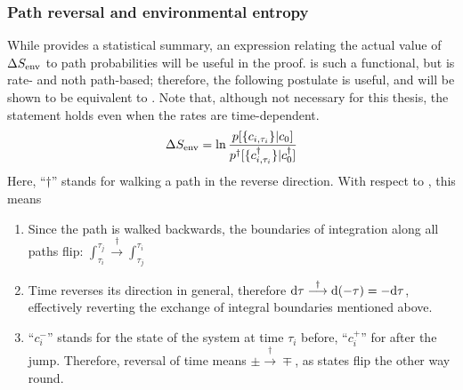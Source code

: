 \subsubsection{Path reversal and environmental entropy}

While  provides a statistical summary, an expression relating the actual value of \(\Delta S_\text{env}\) to path probabilities will be useful in the proof.  is such a functional, but is rate- and noth path-based; therefore, the following postulate is useful, and will be shown to be equivalent to . Note that, although not necessary for this thesis, the statement holds even when the rates are time-dependent.
%
\begin{equation}
	\label{eqn:SEnv path functional}
	\Delta S_\text{env}
	= \ln\frac{p[\{c_{i,\tau_i}\}|c_0]}{p^\dagger[\{c^\dagger_{i,\tau_i}\}|c^\dagger_0]}
\end{equation}
%
Here, ``\(\dagger\)'' stands for walking a path in the reverse direction. With respect to , this means
%
\begin{enumerate}
	\item Since the path is walked backwards, the boundaries of integration along all paths flip: \(\int_{\tau_i}^{\tau_j} \overset\dagger\longrightarrow \int_{\tau_j}^{\tau_i}\)
	\item Time reverses its direction in general, therefore \(\mathrm{d}\tau \overset\dagger\longrightarrow \mathrm{d}(-\tau) = -\mathrm{d}\tau\), effectively reverting the exchange of integral boundaries mentioned above.
	\item ``\(c_i^-\)'' stands for the state of the system at time \(\tau_i\) before, ``\(c_i^+\)'' for after the jump. Therefore, reversal of time means \(\pm\overset\dagger\longrightarrow\mp\), as states flip the other way round.
\end{enumerate}

